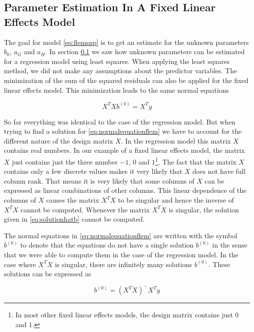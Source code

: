 \documentclass[]{book}
\theoremstyle{definition}
\theoremstyle{definition}
\theoremstyle{definition}
\theoremstyle{remark}
\begin{document}
\hypertarget{asm-flem-parameter-estimation}{%
\subsection{Parameter Estimation In A Fixed Linear Effects Model}\label{asm-flem-parameter-estimation}}

The goal for model \eqref{eq:flemsnp} is to get an estimate for the unknown parameters \(b_0\), \(a_G\) and \(a_H\). In section \ref{asm-flem-parameter-estimation} we saw how unknown parameters can be estimated for a regression model using least squares. When applying the least squares method, we did not make any assumptions about the predictor variables. The minimization of the sum of the squared residuals can also be applied for the fixed linear effects model. This minimization leads to the same normal equations

\begin{equation}
  X^TXb^{(0)} = X^Ty
  \label{eq:normalequationflem}
\end{equation}

So far everything was identical to the case of the regression model. But when trying to find a solution for \eqref{eq:normalequationflem} we have to account for the different nature of the design matrix \(X\). In the regression model this matrix \(X\) contains real numbers. In our example of a fixed linear effects model, the matrix \(X\) just contains just the three number \(-1\), \(0\) and \(1\)\footnote{In most other fixed linear effects models, the design matrix contains just \(0\) and \(1\).}. The fact that the matrix \(X\) contains only a few discrete values makes it very likely that \(X\) does not have full column rank. That means it is very likely that some columns of \(X\) can be expressed as linear combinations of other columns. This linear dependence of the columns of \(X\) causes the matrix \(X^TX\) to be singular and hence the inverse of \(X^TX\) cannot be computed. Whenever the matrix \(X^TX\) is singular, the solution given in \eqref{eq:solutionhatb} cannot be computed.

The normal equations in \eqref{eq:normalequationflem} are written with the symbol \(b^{(0)}\) to denote that the equations do not have a single solution \(b^{(0)}\) in the sense that we were able to compute them in the case of the regression model. In the case where \(X^TX\) is singular, there are infinitely many solutions \(b^{(0)}\). These solutions can be expressed as

\begin{equation}
  b^{(0)} = (X^TX)^-X^Ty
  \label{eq:gensolnormalequationflem}
\end{equation}
\end{document}
